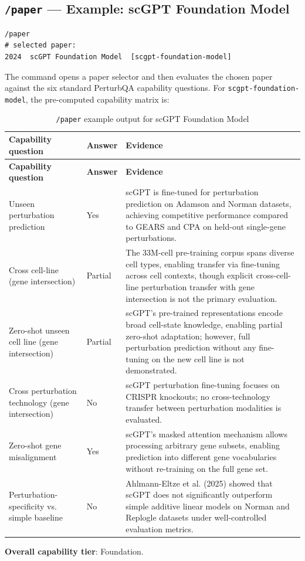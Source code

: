 \documentclass[12pt, a4paper]{article}
\begin{document}
\subsection{\texttt{/paper} --- Example: scGPT Foundation Model}

\begin{lstlisting}[numbers=none]
/paper
# selected paper:
2024  scGPT Foundation Model  [scgpt-foundation-model]
\end{lstlisting}

\noindent The command opens a paper selector and then evaluates the chosen paper against
the six standard PerturbQA capability questions. For \texttt{scgpt-foundation-model}, the
pre-computed capability matrix is:

\begin{longtable}{@{}p{4.1cm}p{2.0cm}p{8.4cm}@{}}
\caption{\texttt{/paper} example output for scGPT Foundation Model} \\
\toprule
\textbf{Capability question} & \textbf{Answer} & \textbf{Evidence} \\
\midrule
\endfirsthead
\toprule
\textbf{Capability question} & \textbf{Answer} & \textbf{Evidence} \\
\midrule
\endhead
\bottomrule
\endfoot

Unseen perturbation prediction &
Yes &
scGPT is fine-tuned for perturbation prediction on Adamson and Norman datasets,
achieving competitive performance compared to GEARS and CPA on held-out single-gene
perturbations. \\

Cross cell-line (gene intersection) &
Partial &
The 33M-cell pre-training corpus spans diverse cell types, enabling transfer via
fine-tuning across cell contexts, though explicit cross-cell-line perturbation transfer
with gene intersection is not the primary evaluation. \\

Zero-shot unseen cell line (gene intersection) &
Partial &
scGPT's pre-trained representations encode broad cell-state knowledge, enabling partial
zero-shot adaptation; however, full perturbation prediction without any fine-tuning on
the new cell line is not demonstrated. \\

Cross perturbation technology (gene intersection) &
No &
scGPT perturbation fine-tuning focuses on CRISPR knockouts; no cross-technology transfer
between perturbation modalities is evaluated. \\

Zero-shot gene misalignment &
Yes &
scGPT's masked attention mechanism allows processing arbitrary gene subsets, enabling
prediction into different gene vocabularies without re-training on the full gene set. \\

Perturbation-specificity vs. simple baseline &
No &
Ahlmann-Eltze et al. (2025) showed that scGPT does not significantly outperform simple
additive linear models on Norman and Replogle datasets under well-controlled evaluation
metrics. \\

\end{longtable}

\noindent \textbf{Overall capability tier}: Foundation.
\end{document}
